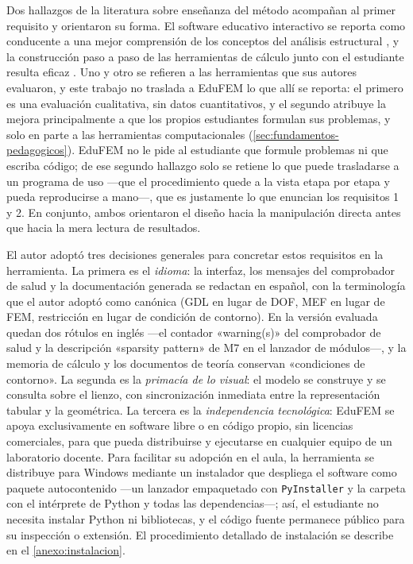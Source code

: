 Dos hallazgos de la literatura sobre enseñanza del método acompañan al primer requisito y orientaron su forma. El software educativo interactivo se reporta como conducente a una mejor comprensión de los conceptos del análisis estructural \autocite[p.~168]{lee2015interactive}, y la construcción paso a paso de las herramientas de cálculo junto con el estudiante resulta eficaz \autocite[p.~1023]{bishay2020teaching}. Uno y otro se refieren a las herramientas que sus autores evaluaron, y este trabajo no traslada a EduFEM lo que allí se reporta: el primero es una evaluación cualitativa, sin datos cuantitativos, y el segundo atribuye la mejora principalmente a que los propios estudiantes formulan sus problemas, y solo en parte a las herramientas computacionales (\autoref{sec:fundamentos-pedagogicos}). EduFEM no le pide al estudiante que formule problemas ni que escriba código; de ese segundo hallazgo solo se retiene lo que puede trasladarse a un programa de uso —que el procedimiento quede a la vista etapa por etapa y pueda reproducirse a mano—, que es justamente lo que enuncian los requisitos 1 y 2. En conjunto, ambos orientaron el diseño hacia la manipulación directa antes que hacia la mera lectura de resultados.

El autor adoptó tres decisiones generales para concretar estos requisitos en la herramienta. La primera es el \emph{idioma}: la interfaz, los mensajes del comprobador de salud y la documentación generada se redactan en español, con la terminología que el autor adoptó como canónica (GDL en lugar de DOF, MEF en lugar de FEM, restricción en lugar de condición de contorno). En la versión evaluada quedan dos rótulos en inglés ---el contador «warning(s)» del comprobador de salud y la descripción «sparsity pattern» de M7 en el lanzador de módulos---, y la memoria de cálculo y los documentos de teoría conservan «condiciones de contorno». La segunda es la \emph{primacía de lo visual}: el modelo se construye y se consulta sobre el lienzo, con sincronización inmediata entre la representación tabular y la geométrica. La tercera es la \emph{independencia tecnológica}: EduFEM se apoya exclusivamente en software libre o en código propio, sin licencias comerciales, para que pueda distribuirse y ejecutarse en cualquier equipo de un laboratorio docente. Para facilitar su adopción en el aula, la herramienta se distribuye para Windows mediante un instalador que despliega el software como paquete autocontenido ---un lanzador empaquetado con \texttt{PyInstaller} y la carpeta con el intérprete de Python y todas las dependencias---; así, el estudiante no necesita instalar Python ni bibliotecas, y el código fuente permanece público para su inspección o extensión. El procedimiento detallado de instalación se describe en el \autoref{anexo:instalacion}.


